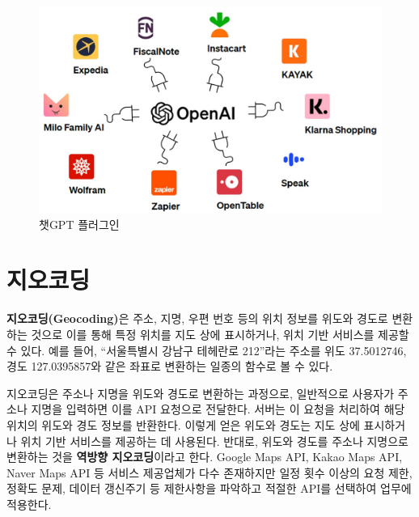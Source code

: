 \documentclass[
  letterpaper,
]{book}
\begin{document}
\begin{figure}

{\centering \includegraphics{images/chatGPT_plugins.jpg}

}

\caption{챗GPT 플러그인}

\end{figure}

\hypertarget{uxc9c0uxc624uxcf54uxb529}{%
\section{지오코딩}\label{uxc9c0uxc624uxcf54uxb529}}

\textbf{지오코딩(Geocoding)}은 주소, 지명, 우편 번호 등의 위치 정보를
위도와 경도로 변환하는 것으로 이를 통해 특정 위치를 지도 상에
표시하거나, 위치 기반 서비스를 제공할 수 있다. 예를 들어, ``서울특별시
강남구 테헤란로 212''라는 주소를 위도 37.5012746, 경도 127.0395857와
같은 좌표로 변환하는 일종의 함수로 볼 수 있다.

지오코딩은 주소나 지명을 위도와 경도로 변환하는 과정으로, 일반적으로
사용자가 주소나 지명을 입력하면 이를 API 요청으로 전달한다. 서버는 이
요청을 처리하여 해당 위치의 위도와 경도 정보를 반환한다. 이렇게 얻은
위도와 경도는 지도 상에 표시하거나 위치 기반 서비스를 제공하는 데
사용된다. 반대로, 위도와 경도를 주소나 지명으로 변환하는 것을
\textbf{역방향 지오코딩}이라고 한다. Google Maps API, Kakao Maps API,
Naver Maps API 등 서비스 제공업체가 다수 존재하지만 일정 횟수 이상의
요청 제한, 정확도 문제, 데이터 갱신주기 등 제한사항을 파악하고 적절한
API를 선택하여 업무에 적용한다.

{}
\end{document}

